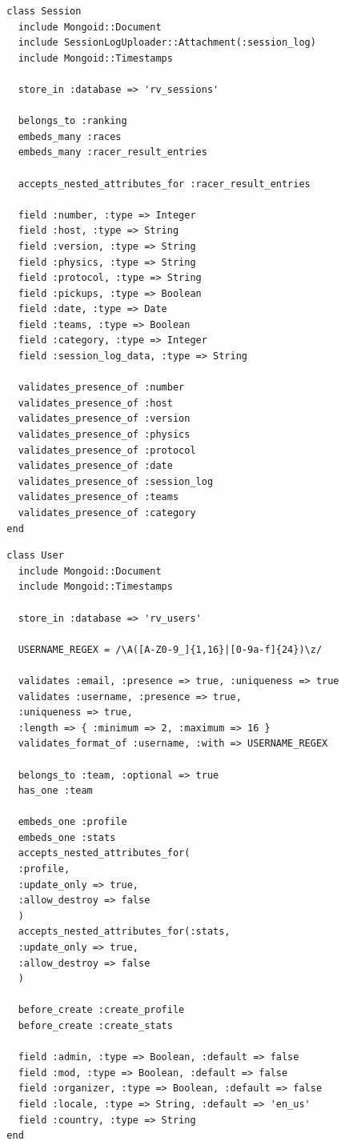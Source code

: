 \begin{listing}
  \begin{verbatim}
  class Session
    include Mongoid::Document
    include SessionLogUploader::Attachment(:session_log)
    include Mongoid::Timestamps
    
    store_in :database => 'rv_sessions'
    
    belongs_to :ranking
    embeds_many :races
    embeds_many :racer_result_entries
    
    accepts_nested_attributes_for :racer_result_entries
    
    field :number, :type => Integer
    field :host, :type => String
    field :version, :type => String
    field :physics, :type => String
    field :protocol, :type => String
    field :pickups, :type => Boolean
    field :date, :type => Date
    field :teams, :type => Boolean
    field :category, :type => Integer
    field :session_log_data, :type => String
    
    validates_presence_of :number
    validates_presence_of :host
    validates_presence_of :version
    validates_presence_of :physics
    validates_presence_of :protocol
    validates_presence_of :date
    validates_presence_of :session_log
    validates_presence_of :teams
    validates_presence_of :category
  end
  \end{verbatim}
\end{listing}

\begin{listing}
  \begin{verbatim}
  class User
    include Mongoid::Document
    include Mongoid::Timestamps
    
    store_in :database => 'rv_users'
    
    USERNAME_REGEX = /\A([A-Z0-9_]{1,16}|[0-9a-f]{24})\z/
    
    validates :email, :presence => true, :uniqueness => true
    validates :username, :presence => true, 
    :uniqueness => true, 
    :length => { :minimum => 2, :maximum => 16 }
    validates_format_of :username, :with => USERNAME_REGEX
    
    belongs_to :team, :optional => true
    has_one :team
    
    embeds_one :profile
    embeds_one :stats
    accepts_nested_attributes_for(
    :profile,
    :update_only => true,
    :allow_destroy => false
    )
    accepts_nested_attributes_for(:stats,
    :update_only => true,
    :allow_destroy => false
    )
    
    before_create :create_profile
    before_create :create_stats
    
    field :admin, :type => Boolean, :default => false
    field :mod, :type => Boolean, :default => false
    field :organizer, :type => Boolean, :default => false
    field :locale, :type => String, :default => 'en_us'
    field :country, :type => String
  end
  \end{verbatim}
\end{listing}

